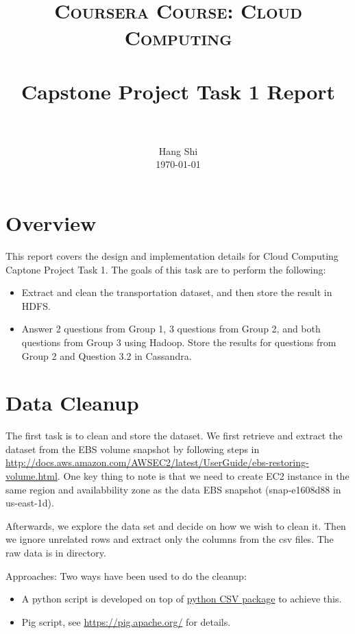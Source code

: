 \documentclass[fontsize=11pt,paper=a4]{scrartcl}
\title{
		\usefont{OT1}{bch}{b}{n}
		\normalfont \normalsize \textsc
		{Coursera Course: Cloud Computing} \\ [25pt]
		\horrule{0.5pt} \\[0.4cm]
		\huge Capstone Project Task 1 Report \\
		\horrule{2pt} \\[0.5cm]
}
\author{
		\normalfont 								\normalsize
        Hang Shi\\[-3pt]		\normalsize
        \today
}
\date{}
\begin{document}
\maketitle


\section{Overview}
This report covers the design and implementation details for Cloud Computing Captone Project Task 1. The goals of this task are to perform the following:
\begin{itemize}
\item Extract and clean the transportation dataset, and then store the result in HDFS.
\item Answer 2 questions from Group 1, 3 questions from Group 2, and both questions from Group 3 using Hadoop. Store the results for questions from Group 2 and Question 3.2 in Cassandra.   
\end{itemize}
 
\section{Data Cleanup}
\par The first task is to clean and store the dataset. We  first retrieve and extract the dataset from the EBS volume snapshot by following steps in \url{http://docs.aws.amazon.com/AWSEC2/latest/UserGuide/ebs-restoring-volume.html}. One key thing to note is that we need to create EC2 instance in the same region and availabbility zone as the data EBS snapshot (snap-e1608d88 in us-east-1d).   
\par Afterwards, we explore the data set and decide on how we wish to clean it. Then we ignore unrelated rows and extract only the columns from the csv files. The raw data is in  directory. 
\par Approaches: Two ways have been used to do the cleanup: 
\begin{itemize} 
\item A python script is developed on top of \href{https://docs.python.org/2/library/csv.html}{python CSV package} to achieve this. 
\item Pig script, see \url{https://pig.apache.org/} for details. 
\end{itemize}
\end{document}

